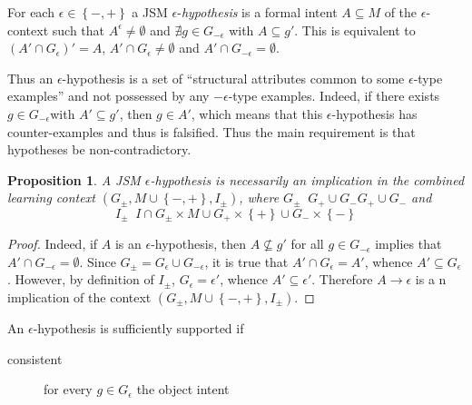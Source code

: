 \documentclass[a4paper]{article}
\newcommand{\obj}[1]{{\left\{ #1 \right \}}}
\newcommand{\brac}[1]{{\left ( #1 \right )}}
\newtheorem{prop}{Proposition}
\newcommand{\defn}{\mathop{\overset{\Delta}{=}}\nolimits}
\begin{document}
For each $\epsilon\in \obj{-,+}$ a JSM $\epsilon$-\emph{hypothesis} is a formal intent $A\subseteq M$ of the $\epsilon$-context such that $A^\epsilon\neq \emptyset$ and $\nexists g\in G_{-\epsilon}$ with $A\subseteq g'$. This is equivalent to $\brac{A'\cap G_\epsilon}' = A$, $A'\cap G_\epsilon\neq \emptyset$ and $A'\cap G_{-\epsilon} = \emptyset$.


Thus an $\epsilon$-hypothesis is a set of ``structural attributes common to some $\epsilon$-type examples'' and not possessed by any $-\epsilon$-type examples. Indeed, if there exists $g\in G_{-\epsilon}$with $A'\subseteq g'$, then $g\in A'$, which means that this $\epsilon$-hypothesis has counter-examples and thus is falsified. Thus the main requirement is that hypotheses be non-contradictory.

\begin{prop} A JSM $\epsilon$-hypothesis is necessarily an implication in the combined learning context $\brac{ G_\pm, M \cup \obj{-,+}, I_\pm }$, where $G_\pm \defn G_+\cup G_-G_+\cup G_-$ and \[I_\pm \defn I\cap G_\pm\times M \cup G_+\times\obj{+} \cup G_-\times\obj{-}\]
\end{prop}

\begin{proof}
Indeed, if $A$ is an $\epsilon$-hypothesis, then $A\not\subseteq g'$ for all $g\in G_{-\epsilon}$ implies that $A'\cap G_{-\epsilon} = \emptyset$. Since $G_\pm = G_\epsilon \cup G_{-\epsilon}$, it is true that $A'\cap G_\epsilon = A'$, whence $A'\subseteq G_\epsilon$. However, by definition of $I_\pm$, $G_\epsilon = \epsilon'$, whence $A'\subseteq \epsilon'$. Therefore $A\to \epsilon$ is a n implication of the context $\brac{ G_\pm, M \cup \obj{-,+}, I_\pm}$.
\end{proof}

An $\epsilon$-hypothesis is sufficiently supported if \begin{description}
	\item[consistent] for every $g\in G_\epsilon$ the object intent 
\end{description}

\end{document}
